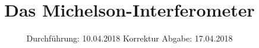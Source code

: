 

\subject{Versuch 401}
\title{Das Michelson-Interferometer}
\date{
  Durchführung: 10.04.2018
  \hspace{3em}
  Korrektur Abgabe: 17.04.2018
}



\maketitle
\thispagestyle{empty}
\tableofcontents
\newpage





\printbibliography{}
\newpage


